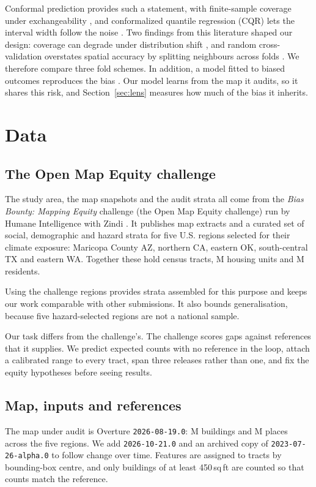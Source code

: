 \documentclass[conference]{IEEEtran}
\begin{document}
Conformal prediction provides such a statement, with finite-sample coverage under exchangeability \cite{vovk2005,lei2018}, and conformalized quantile regression (CQR) lets the interval width follow the noise \cite{romano2019}. Two findings from this literature shaped our design: coverage can degrade under distribution shift \cite{tibshirani2019}, and random cross-validation overstates spatial accuracy by splitting neighbours across folds \cite{roberts2017}. We therefore compare three fold schemes. In addition, a model fitted to biased outcomes reproduces the bias \cite{obermeyer2019}. Our model learns from the map it audits, so it shares this risk, and Section~\ref{sec:lens} measures how much of the bias it inherits.

\section{Data}
\subsection{The Open Map Equity challenge}
The study area, the map snapshots and the audit strata all come from the \emph{Bias Bounty: Mapping Equity} challenge (the Open Map Equity challenge) run by Humane Intelligence with Zindi \cite{biasbounty}. It publishes map extracts and a curated set of social, demographic and hazard strata for five U.S. regions selected for their climate exposure: Maricopa County AZ, northern CA, eastern OK, south-central TX and eastern WA. Together these hold \NTracts{} census tracts, \NHU{}M housing units and \NPop{}M residents.

Using the challenge regions provides strata assembled for this purpose and keeps our work comparable with other submissions. It also bounds generalisation, because five hazard-selected regions are not a national sample.

Our task differs from the challenge's. The challenge scores gaps against references that it supplies. We predict expected counts with no reference in the loop, attach a calibrated range to every tract, span three releases rather than one, and fix the equity hypotheses before seeing results.

\subsection{Map, inputs and references}
The map under audit is Overture \texttt{2026-08-19.0}: \NBldg{}M buildings and \NPoi{}M places across the five regions. We add \texttt{2026-10-21.0} and an archived copy of \texttt{2023-07-26-alpha.0} to follow change over time. Features are assigned to tracts by bounding-box centre, and only buildings of at least 450\,sq\,ft are counted so that counts match the reference.
\end{document}
